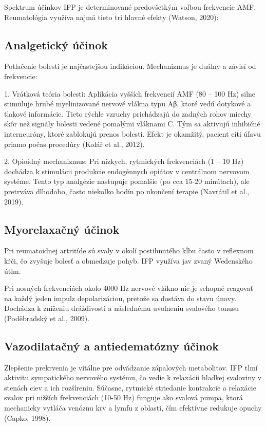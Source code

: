 Spektrum účinkov IFP je determinované predovšetkým voľbou frekvencie AMF. Reumatológia využíva najmä tieto tri hlavné efekty (Watson, 2020): 

\subsection{Analgetický účinok}

Potlačenie bolesti je najčastejšou indikáciou. Mechanizmus je duálny a závisí od frekvencie: 

1. Vrátková teória bolesti: Aplikácia vyšších frekvencií AMF (80 – 100 Hz) silne stimuluje hrubé myelinizované nervové vlákna typu Aβ, ktoré vedú dotykové a tlakové informácie. Tieto rýchle vzruchy prichádzajú do zadných rohov miechy skôr než signály bolesti vedené pomalými vláknami C. Tým sa aktivujú inhibičné interneuróny, ktoré zablokujú prenos bolesti. Efekt je okamžitý, pacient cíti úľavu priamo počas procedúry (Kolář et al., 2012). 

2. Opioidný mechanizmus: Pri nízkych, rytmických frekvenciách (1 – 10 Hz) dochádza k stimulácii produkcie endogénnych opiátov v centrálnom nervovom systéme. Tento typ analgézie nastupuje pomalšie (po cca 15-20 minútach), ale pretrváva dlhodobo, často niekoľko hodín po ukončení terapie (Navrátil et al., 2019). 

\subsection{Myorelaxačný účinok}

Pri reumatoidnej artritíde sú svaly v okolí postihnutého kĺbu často v reflexnom kŕči, čo zvyšuje bolesť a obmedzuje pohyb. IFP využíva jav zvaný Wedenského útlm. 

Pri nosných frekvenciách okolo 4000 Hz nervové vlákno nie je schopné reagovať na každý jeden impulz depolarizáciou, pretože sa dostáva do stavu únavy. Dochádza k zníženiu dráždivosti a následnému uvoľneniu svalového tonusu (Poděbradský et al., 2009). 

\subsection{Vazodilatačný a antiedematózny účinok}

Zlepšenie prekrvenia je vitálne pre odvádzanie zápalových metabolitov. IFP tlmí aktivitu sympatického nervového systému, čo vedie k relaxácii hladkej svaloviny v stenách ciev a ich rozšíreniu. Súčasne, rytmické striedanie kontrakcie a relaxácie svalov pri nižších frekvenciách (10-50 Hz) funguje ako svalová pumpa, ktorá mechanicky vytláča venóznu krv a lymfu z oblasti, čím efektívne redukuje opuchy (Capko, 1998). 

